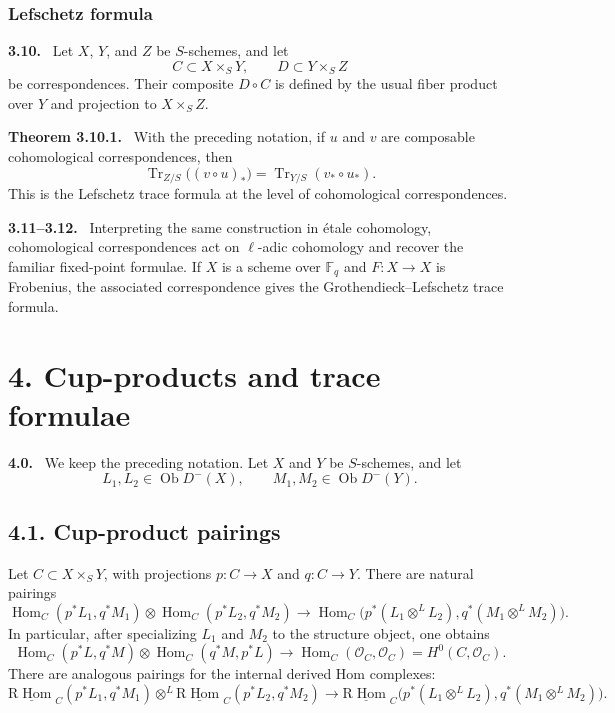 \documentclass[12pt]{article}
\newcommand{\FF}{\mathbb F}
\newcommand{\Hom}{\operatorname{Hom}}
\newcommand{\Tr}{\operatorname{Tr}}
\newcommand{\ob}{\operatorname{Ob}}
\newcommand{\R}{\mathrm R}
\newcommand{\cO}{\mathcal O}
\newenvironment{statement}[1]{\par\medskip\noindent\textbf{#1.}\ }{\par\medskip}
\begin{document}
\subsubsection*{Lefschetz formula}

\begin{statement}{3.10}
Let $X$, $Y$, and $Z$ be $S$-schemes, and let
\[
   C\subset X\times_S Y,
   \qquad
   D\subset Y\times_S Z
\]
be correspondences. Their composite $D\circ C$ is defined by the usual fiber product over $Y$ and projection to $X\times_S Z$.
\end{statement}

\begin{statement}{Theorem 3.10.1}
With the preceding notation, if $u$ and $v$ are composable cohomological correspondences, then
\[
   \Tr_{Z/S}\bigl((v\circ u)_*\bigr)=\Tr_{Y/S}(v_*\circ u_*).
\]
This is the Lefschetz trace formula at the level of cohomological correspondences.
\end{statement}

\begin{statement}{3.11--3.12}
Interpreting the same construction in étale cohomology, cohomological correspondences act on $\ell$-adic cohomology and recover the familiar fixed-point formulae. If $X$ is a scheme over $\FF_q$ and $F:X\to X$ is Frobenius, the associated correspondence gives the Grothendieck--Lefschetz trace formula.
\end{statement}

\section*{4. Cup-products and trace formulae}

\begin{statement}{4.0}
We keep the preceding notation. Let $X$ and $Y$ be $S$-schemes, and let
\[
   L_1,L_2\in\ob D^-(X),\qquad M_1,M_2\in\ob D^-(Y).
\]
\end{statement}

\subsection*{4.1. Cup-product pairings}
Let $C\subset X\times_S Y$, with projections $p:C\to X$ and $q:C\to Y$. There are natural pairings
\begin{equation}
\Hom_C(p^*L_1,q^*M_1)\otimes \Hom_C(p^*L_2,q^*M_2)
\longrightarrow
\Hom_C\bigl(p^*(L_1\otimes^L L_2),q^*(M_1\otimes^L M_2)\bigr).
\tag{4.1.1}
\end{equation}
In particular, after specializing $L_1$ and $M_2$ to the structure object, one obtains
\begin{equation}
\Hom_C(p^*L,q^*M)\otimes \Hom_C(q^*M,p^*L)
\longrightarrow \Hom_C(\cO_C,\cO_C)=H^0(C,\cO_C).
\tag{4.1.2}
\end{equation}
There are analogous pairings for the internal derived Hom complexes:
\begin{equation}
\underline{\R\Hom}_C(p^*L_1,q^*M_1)\otimes^L
\underline{\R\Hom}_C(p^*L_2,q^*M_2)
\longrightarrow
\underline{\R\Hom}_C\bigl(p^*(L_1\otimes^L L_2),q^*(M_1\otimes^L M_2)\bigr).
\tag{4.1.4}
\end{equation}
\end{document}
